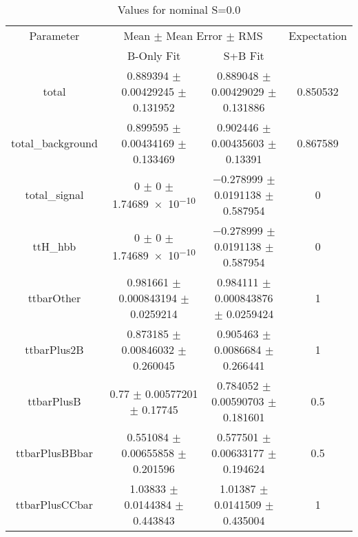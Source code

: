 \begin{table}
\centering
\caption{Values for nominal S=0.0}
\begin{tabular}{cccc}
\toprule
Parameter & \multicolumn{2}{c}{Mean $\pm$ Mean Error $\pm$ RMS} & Expectation\\
 & B-Only Fit & S+B Fit & \\
\midrule
total & \num{0.889394} $\pm$ \num{0.00429245} $\pm$ \num{0.131952} & \num{0.889048} $\pm$ \num{0.00429029} $\pm$ \num{0.131886} & \num{0.850532}\\
total\_background & \num{0.899595} $\pm$ \num{0.00434169} $\pm$ \num{0.133469} & \num{0.902446} $\pm$ \num{0.00435603} $\pm$ \num{0.13391} & \num{0.867589}\\
total\_signal & \num{0} $\pm$ \num{0} $\pm$ \num{1.74689e-10} & \num{-0.278999} $\pm$ \num{0.0191138} $\pm$ \num{0.587954} & \num{0}\\
ttH\_hbb & \num{0} $\pm$ \num{0} $\pm$ \num{1.74689e-10} & \num{-0.278999} $\pm$ \num{0.0191138} $\pm$ \num{0.587954} & \num{0}\\
ttbarOther & \num{0.981661} $\pm$ \num{0.000843194} $\pm$ \num{0.0259214} & \num{0.984111} $\pm$ \num{0.000843876} $\pm$ \num{0.0259424} & \num{1}\\
ttbarPlus2B & \num{0.873185} $\pm$ \num{0.00846032} $\pm$ \num{0.260045} & \num{0.905463} $\pm$ \num{0.0086684} $\pm$ \num{0.266441} & \num{1}\\
ttbarPlusB & \num{0.77} $\pm$ \num{0.00577201} $\pm$ \num{0.17745} & \num{0.784052} $\pm$ \num{0.00590703} $\pm$ \num{0.181601} & \num{0.5}\\
ttbarPlusBBbar & \num{0.551084} $\pm$ \num{0.00655858} $\pm$ \num{0.201596} & \num{0.577501} $\pm$ \num{0.00633177} $\pm$ \num{0.194624} & \num{0.5}\\
ttbarPlusCCbar & \num{1.03833} $\pm$ \num{0.0144384} $\pm$ \num{0.443843} & \num{1.01387} $\pm$ \num{0.0141509} $\pm$ \num{0.435004} & \num{1}\\
\bottomrule
\end{tabular}
\end{table}